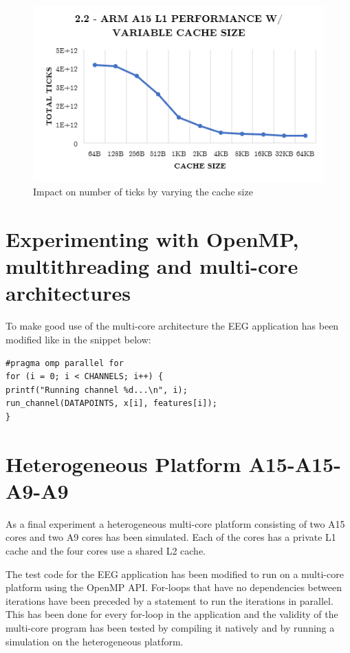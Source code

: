 \documentclass[a4paper, 10pt, conference]{ieeeconf}      %
\begin{document}
\begin{figure}[thpb]
\centering
\includegraphics[scale=.5]{ex2_2.png}
\caption{Impact on number of ticks by varying the cache size}
\label{figure2_2}
\end{figure}

\section{Experimenting with OpenMP, multithreading and multi-core architectures}

To make good use of the multi-core architecture the EEG application has been modified like in the snippet below:

\begin{lstlisting}
#pragma omp parallel for
for (i = 0; i < CHANNELS; i++) {
printf("Running channel %d...\n", i);
run_channel(DATAPOINTS, x[i], features[i]);
}
\end{lstlisting}

\section{Heterogeneous Platform A15-A15-A9-A9}
As a final experiment a heterogeneous multi-core platform consisting of two A15 cores and two A9 cores has been simulated. Each of the cores has a private L1 cache and the four cores use a shared L2 cache.

The test code for the EEG application has been modified to run on a multi-core platform using the OpenMP API. For-loops that have no dependencies between iterations have been preceded by a statement to run the iterations in parallel. This has been done for every for-loop in the application and the validity of the multi-core program has been tested by compiling it natively and by running a simulation on the heterogeneous platform.
\end{document}
